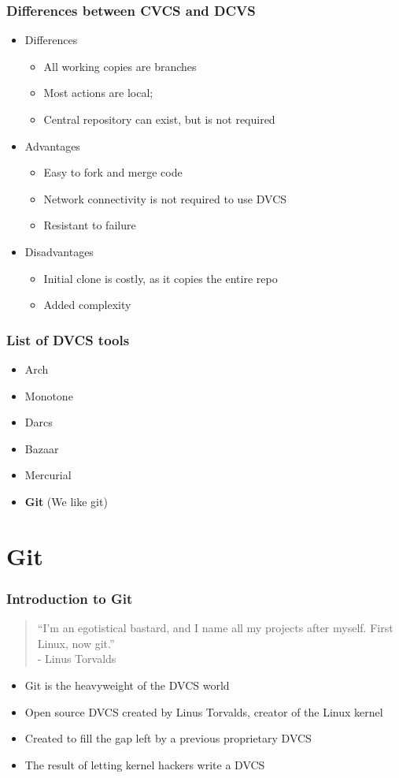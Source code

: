 \documentclass{beamer}
\begin{document}
\begin{frame}
  \frametitle{Differences between CVCS and DCVS}
  \begin{itemize}
    \item Differences
      \begin{itemize}
	\item All working copies are branches
	\item Most actions are local;
	\item Central repository can exist, but is not required
      \end{itemize}
    \item Advantages
      \begin{itemize}
	\item Easy to fork and merge code
	\item Network connectivity is not required to use DVCS
	\item Resistant to failure
      \end{itemize}
    \item Disadvantages
      \begin{itemize}
	\item Initial clone is costly, as it copies the entire repo
	\item Added complexity 
      \end{itemize}
  \end{itemize}
\end{frame}

\begin{frame}
  \frametitle{List of DVCS tools}
  \begin{itemize}
    \item Arch
    \item Monotone
    \item Darcs
    \item Bazaar
    \item Mercurial
    \item {\bf Git} (We like git)
  \end{itemize}
\end{frame}


\section{Git}

\begin{frame}
  \frametitle{Introduction to Git}
  \begin{quotation}
    ``I'm an egotistical bastard, and I name all my projects after myself. First Linux, now git.'' \\
    - Linus Torvalds
  \end{quotation}
  \begin{itemize}
    \item Git is the heavyweight of the DVCS world
    \item Open source DVCS created by Linus Torvalds, creator of the Linux kernel
    \item Created to fill the gap left by a previous proprietary DVCS
    \item The result of letting kernel hackers write a DVCS
  \end{itemize}
\end{frame}
\end{document}
